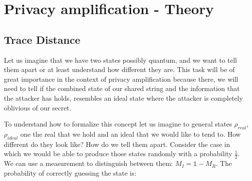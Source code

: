 \chapter{Privacy amplification - Theory}\label{chap:PA_theroy}

\section{Trace Distance}\label{sec:Trace Distance}


Let us imagine that we have two states possibly quantum, and we want to tell them apart or at least understand how different they are. This task will be of great importance in the context of  privacy amplification because there, we will need to tell if the combined state of our shared string and the information that the attacker has holds, resembles an ideal state where the attacker is completely oblivious of our secret.

To understand how to formalize this concept let us imagine to general states $\rho_{real}$, $\rho_{ideal}$ one the real that we hold and an ideal that we would like to tend to. How different do they look like? How do we tell them apart. Consider the case in which we would be able to produce those states randomly with a probability $\frac{1}{2}$. We can use a measurement to distinguish between them: $M_I = \mathbb{1} - M_R$. The probability of correctly guessing the state is:


